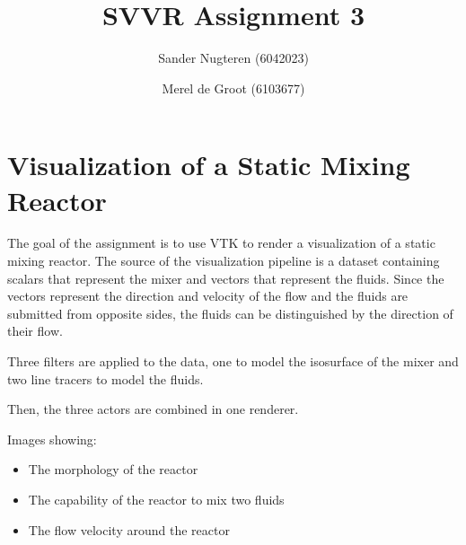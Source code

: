 \documentclass{article}
\begin{document}
\title{SVVR Assignment 3}
\author{Sander Nugteren (6042023) \and Merel de Groot (6103677)}
\renewcommand{\today}{November 24, 2014}
\maketitle

\section*{Visualization of a Static Mixing Reactor}
The goal of the assignment is to use VTK to render a visualization of a static mixing reactor. The source of the visualization pipeline is a dataset containing scalars that represent the mixer and vectors that represent the fluids. Since the vectors represent the direction and velocity of the flow and the fluids are submitted from opposite sides, the fluids can be distinguished by the direction of their flow. 

Three filters are applied to the data, one to model the isosurface of the mixer and two line tracers to model the fluids. 

Then, the three actors are combined in one renderer. 

Images showing:
\begin{itemize}
\item The morphology of the reactor
\item The capability of the reactor to mix two fluids
\item The flow velocity around the reactor
\end{itemize}
\end{document}
